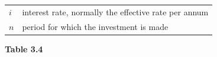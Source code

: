 \begin{itemize}[noitemsep]
{\begin{center}
\begin{xtabular*}{\mytablewidth}[t]{|p{10\mystarwidth}|p{10\mystarwidth}|}
    
        
                  \begin{math}i\end{math}
                 &
    
    
        interest rate, normally the effective rate per annum%
     \tabularnewline{}
    
    
        
                  \begin{math}n\end{math}
                 &
    
    
        period for which the investment is made%
     \tabularnewline{}
    \end{xtabular*}
      \end{center}
    \begin{center}{\small\bfseries Table 3.4}\end{center}
    
    \addtocounter{footnote}{-0}
    
        }%
      
    \par
  

\end{itemize}
